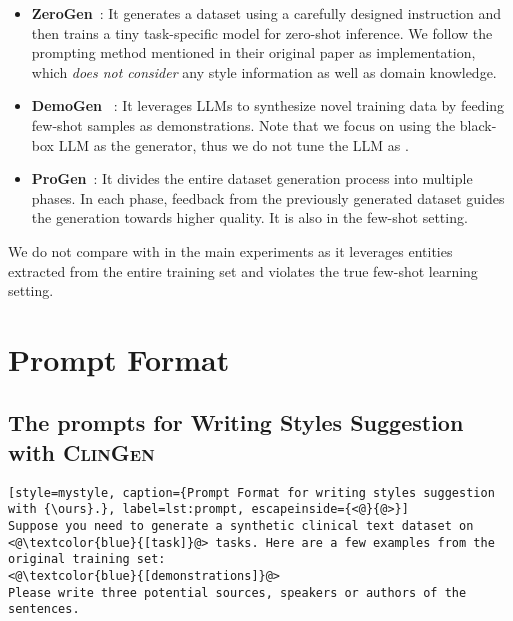 \documentclass{article} %
\newcommand{\ours}{\textsc{ClinGen}\xspace}
\begin{document}
\begin{itemize}[leftmargin=0.5cm]
\item \textbf{ZeroGen}~\citep{ye2022zerogen}: It generates a dataset using a carefully designed instruction and then trains a tiny task-specific model for zero-shot inference. 
We follow the prompting method mentioned in their original paper as implementation, which \emph{does not consider} any style information as well as domain knowledge.
\item \textbf{DemoGen} ~\citep{meng2023tuning,gpt3mix}: It leverages LLMs to synthesize novel training data by  feeding few-shot samples as demonstrations. Note that we focus on using the black-box LLM as the generator, thus we do not tune the LLM as \citep{meng2023tuning}.
\item \textbf{ProGen}~\citep{ye2022progen}: It divides the entire dataset generation process into multiple phases. In each phase, feedback from the previously generated dataset guides the generation towards higher quality. It is also in the few-shot setting.
\end{itemize}

We do not compare with \cite{tang2023does} in the main experiments as it leverages entities extracted from the entire training set and violates the true few-shot learning setting.



\section{Prompt Format}
\label{sec:prompt_format}
\subsection{The prompts for Writing Styles Suggestion with {\ours}}
\label{sec: style_prompt}

\begin{lstlisting}[style=mystyle, caption={Prompt Format for writing styles suggestion with {\ours}.}, label=lst:prompt, escapeinside={<@}{@>}]
Suppose you need to generate a synthetic clinical text dataset on <@\textcolor{blue}{[task]}@> tasks. Here are a few examples from the original training set:
<@\textcolor{blue}{[demonstrations]}@>
Please write three potential sources, speakers or authors of the sentences.

\end{lstlisting}
\end{document}
